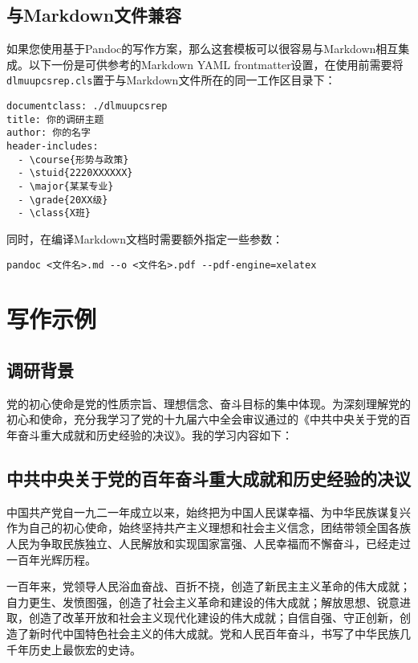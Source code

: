 \documentclass[12pt]{dlmuupcsrep}
\begin{document}
\subsection{与Markdown文件兼容}

如果您使用基于Pandoc的写作方案，那么这套模板可以很容易与Markdown相互集成。以下一份是可供参考的Markdown YAML frontmatter设置，在使用前需要将\texttt{dlmuupcsrep.cls}置于与Markdown文件所在的同一工作区目录下：

\begin{verbatim}
documentclass: ./dlmuupcsrep
title: 你的调研主题
author: 你的名字
header-includes:
  - \course{形势与政策}
  - \stuid{2220XXXXXX}
  - \major{某某专业}
  - \grade{20XX级}
  - \class{X班}
\end{verbatim}

同时，在编译Markdown文档时需要额外指定一些参数：

\begin{verbatim}
pandoc <文件名>.md --o <文件名>.pdf --pdf-engine=xelatex
\end{verbatim}

\section{写作示例}

\subsection{调研背景}

党的初心使命是党的性质宗旨、理想信念、奋斗目标的集中体现。为深刻理解党的初心和使命，充分我学习了党的十九届六中全会审议通过的《中共中央关于党的百年奋斗重大成就和历史经验的决议》。我的学习内容如下：

\subsection{中共中央关于党的百年奋斗重大成就和历史经验的决议}

中国共产党自一九二一年成立以来，始终把为中国人民谋幸福、为中华民族谋复兴作为自己的初心使命，始终坚持共产主义理想和社会主义信念，团结带领全国各族人民为争取民族独立、人民解放和实现国家富强、人民幸福而不懈奋斗，已经走过一百年光辉历程。

一百年来，党领导人民浴血奋战、百折不挠，创造了新民主主义革命的伟大成就；自力更生、发愤图强，创造了社会主义革命和建设的伟大成就；解放思想、锐意进取，创造了改革开放和社会主义现代化建设的伟大成就；自信自强、守正创新，创造了新时代中国特色社会主义的伟大成就。党和人民百年奋斗，书写了中华民族几千年历史上最恢宏的史诗。
\end{document}
